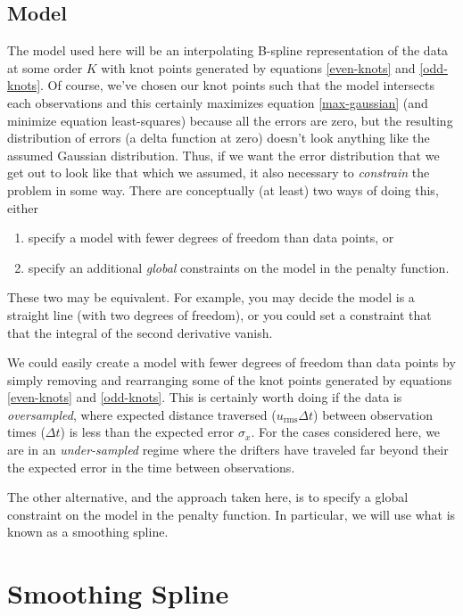 \documentclass[twocol]{ametsoc}
\begin{document}
\subsection{Model}

The model used here will be an interpolating B-spline representation of the data at some order $K$ with knot points generated by equations \ref{even-knots} and \ref{odd-knots}. Of course, we've chosen our knot points such that the model intersects each observations and this certainly maximizes equation \ref{max-gaussian} (and minimize equation least-squares) because all the errors are zero, but the resulting distribution of errors (a delta function at zero) doesn't look anything like the assumed Gaussian distribution. Thus, if we want the error distribution that we get out to look like that which we assumed, it also necessary to \emph{constrain} the problem in some way. There are conceptually (at least) two ways of doing this, either 
\begin{enumerate}
\item specify a model with fewer degrees of freedom than data points, or
\item specify an additional \emph{global} constraints on the model in the penalty function.
\end{enumerate}
These two may be equivalent. For example, you may decide the model is a straight line (with two degrees of freedom), or you could set a constraint that that the integral of the second derivative vanish.

We could easily create a model with fewer degrees of freedom than data points by simply removing and rearranging  some of the knot points generated by equations \ref{even-knots} and \ref{odd-knots}. This is certainly worth doing if the data is \emph{oversampled}, where expected distance traversed ($u_{\textrm{rms}}\Delta t$) between observation times ($\Delta t$) is less than the expected error $\sigma_x$. For the cases considered here, we are in an \emph{under-sampled} regime where the drifters have traveled far beyond their the expected error in the time between observations.

The other alternative, and the approach taken here, is to specify a global constraint on the model in the penalty function. In particular, we will use what is known as a smoothing spline.

%
\section{Smoothing Spline}
%
\end{document}
